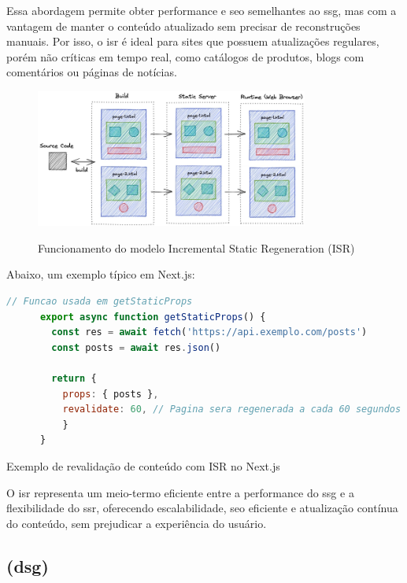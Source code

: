 Essa abordagem permite obter performance e \acrshort{seo} semelhantes ao \acrshort{ssg}, mas com a vantagem de manter o conteúdo atualizado sem precisar de reconstruções manuais. Por isso, o \acrshort{isr} é ideal para sites que possuem atualizações regulares, porém não críticas em tempo real, como catálogos de produtos, blogs com comentários ou páginas de notícias.

\begin{figure}[H]
  \centering
  \caption{Funcionamento do modelo Incremental Static Regeneration (ISR)}
  \includegraphics[width=0.8\textwidth]{media/incremental_static_regeneration.png}
  \label{fig:isr}
\end{figure}

Abaixo, um exemplo típico em Next.js:

\begin{codigo}[H]
  \begin{lstlisting}[language=JavaScript]
      // Funcao usada em getStaticProps
      export async function getStaticProps() {
        const res = await fetch('https://api.exemplo.com/posts')
        const posts = await res.json()

        return {
          props: { posts },
          revalidate: 60, // Pagina sera regenerada a cada 60 segundos
          }
      }
  \end{lstlisting}
  \caption{Exemplo de revalidação de conteúdo com ISR no Next.js}
  \label{cod:isr_next}
\end{codigo}


O \acrshort{isr} representa um meio-termo eficiente entre a performance do \acrshort{ssg} e a flexibilidade do \acrshort{ssr}, oferecendo escalabilidade, \acrshort{seo} eficiente e atualização contínua do conteúdo, sem prejudicar a experiência do usuário.




\subsection{ (\acrshort{dsg})}
\label{subsec:deferred-dsg}

